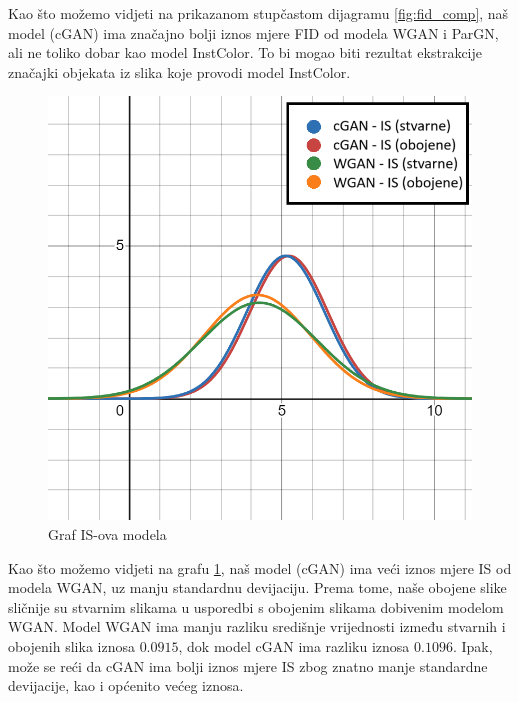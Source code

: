 Kao što možemo vidjeti na prikazanom stupčastom dijagramu \ref{fig:fid_comp}, naš model (cGAN) ima značajno bolji iznos mjere FID od modela WGAN\cite{pix2pixwgan} i ParGN\cite{kumar2022paracolorizer}, ali ne toliko dobar kao model InstColor\cite{Su_2020_CVPR}. To bi mogao biti rezultat ekstrakcije značajki objekata iz slika koje provodi model InstColor\cite{Su_2020_CVPR}.

\begin{figure}[H]
    \centering
    \includegraphics[width=0.75\linewidth]{imgs/is_comp.png}
    \caption{Graf IS-ova modela}
    \label{fig:is_comp}
\end{figure}

Kao što možemo vidjeti na grafu \ref{fig:is_comp}, naš model (cGAN) ima veći iznos mjere IS od modela WGAN\cite{pix2pixwgan}, uz manju standardnu devijaciju. Prema tome, naše obojene slike sličnije su stvarnim slikama u usporedbi s obojenim slikama dobivenim modelom WGAN\cite{pix2pixwgan}. Model WGAN\cite{pix2pixwgan} ima manju razliku središnje vrijednosti između stvarnih i obojenih slika iznosa $0.0915$, dok model cGAN ima razliku iznosa $0.1096$. Ipak, može se reći da cGAN ima bolji iznos mjere IS zbog znatno manje standardne devijacije, kao i općenito većeg iznosa.